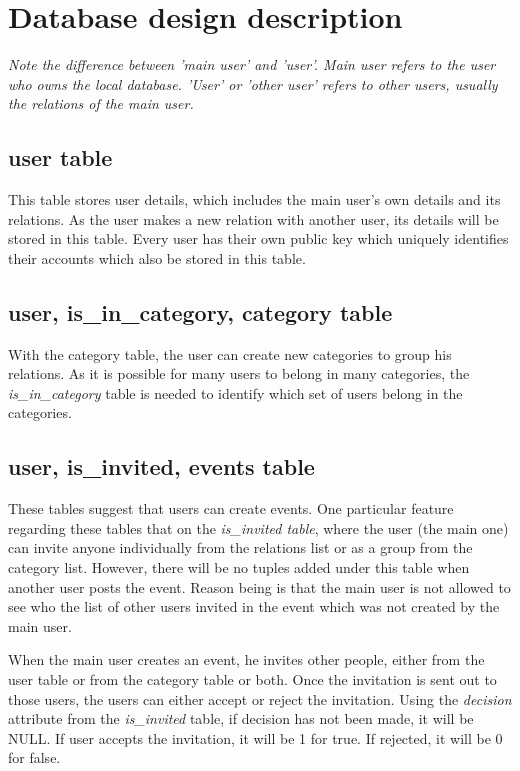 \section{Database design description}
{\it Note the difference between 'main user' and 'user'. Main user refers to the user who owns the local database. 'User' or 'other user' refers to other users, usually the relations of the main user.}
\subsection{user table} 
This table stores user details, which includes the main user's own details and its relations. As the user makes a new relation with another user, its details will be stored in this table. Every user has their own public key which uniquely identifies their accounts which also be stored in this table.

\subsection{user, is\_in\_category, category table}
With the category table, the user can create new categories to group his relations. As it is possible for many users to belong in many categories, the {\it is\_in\_category} table is needed to identify which set of users belong in the categories.

\subsection{user, is\_invited, events table}
These tables suggest that users can create events. One particular feature regarding these tables that on the {\it is\_invited table}, where the user (the main one) can invite anyone individually from the relations list or as a group from the category list. However, there will be no tuples added under this table when another user posts the event. Reason being is that the main user is not allowed to see who the list of other users invited in the event which was not created by the main user. 

When the main user creates an event, he invites other people, either from the user table or from the category table or both. Once the invitation is sent out to those users, the users can either accept or reject the invitation. Using the {\it decision} attribute from the {\it is\_invited} table, if decision has not been made, it will be NULL. If user accepts the invitation, it will be 1 for true. If rejected, it will be 0 for false. 

